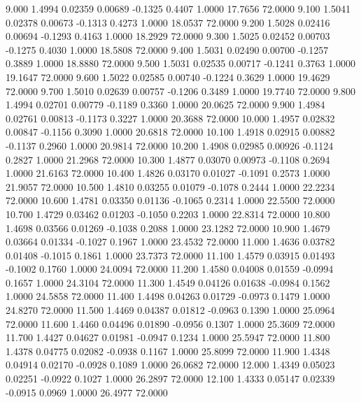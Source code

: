    9.000   1.4994   0.02359   0.00689  -0.1325   0.4407   1.0000  17.7656  72.0000
   9.100   1.5041   0.02378   0.00673  -0.1313   0.4273   1.0000  18.0537  72.0000
   9.200   1.5028   0.02416   0.00694  -0.1293   0.4163   1.0000  18.2929  72.0000
   9.300   1.5025   0.02452   0.00703  -0.1275   0.4030   1.0000  18.5808  72.0000
   9.400   1.5031   0.02490   0.00700  -0.1257   0.3889   1.0000  18.8880  72.0000
   9.500   1.5031   0.02535   0.00717  -0.1241   0.3763   1.0000  19.1647  72.0000
   9.600   1.5022   0.02585   0.00740  -0.1224   0.3629   1.0000  19.4629  72.0000
   9.700   1.5010   0.02639   0.00757  -0.1206   0.3489   1.0000  19.7740  72.0000
   9.800   1.4994   0.02701   0.00779  -0.1189   0.3360   1.0000  20.0625  72.0000
   9.900   1.4984   0.02761   0.00813  -0.1173   0.3227   1.0000  20.3688  72.0000
  10.000   1.4957   0.02832   0.00847  -0.1156   0.3090   1.0000  20.6818  72.0000
  10.100   1.4918   0.02915   0.00882  -0.1137   0.2960   1.0000  20.9814  72.0000
  10.200   1.4908   0.02985   0.00926  -0.1124   0.2827   1.0000  21.2968  72.0000
  10.300   1.4877   0.03070   0.00973  -0.1108   0.2694   1.0000  21.6163  72.0000
  10.400   1.4826   0.03170   0.01027  -0.1091   0.2573   1.0000  21.9057  72.0000
  10.500   1.4810   0.03255   0.01079  -0.1078   0.2444   1.0000  22.2234  72.0000
  10.600   1.4781   0.03350   0.01136  -0.1065   0.2314   1.0000  22.5500  72.0000
  10.700   1.4729   0.03462   0.01203  -0.1050   0.2203   1.0000  22.8314  72.0000
  10.800   1.4698   0.03566   0.01269  -0.1038   0.2088   1.0000  23.1282  72.0000
  10.900   1.4679   0.03664   0.01334  -0.1027   0.1967   1.0000  23.4532  72.0000
  11.000   1.4636   0.03782   0.01408  -0.1015   0.1861   1.0000  23.7373  72.0000
  11.100   1.4579   0.03915   0.01493  -0.1002   0.1760   1.0000  24.0094  72.0000
  11.200   1.4580   0.04008   0.01559  -0.0994   0.1657   1.0000  24.3104  72.0000
  11.300   1.4549   0.04126   0.01638  -0.0984   0.1562   1.0000  24.5858  72.0000
  11.400   1.4498   0.04263   0.01729  -0.0973   0.1479   1.0000  24.8270  72.0000
  11.500   1.4469   0.04387   0.01812  -0.0963   0.1390   1.0000  25.0964  72.0000
  11.600   1.4460   0.04496   0.01890  -0.0956   0.1307   1.0000  25.3609  72.0000
  11.700   1.4427   0.04627   0.01981  -0.0947   0.1234   1.0000  25.5947  72.0000
  11.800   1.4378   0.04775   0.02082  -0.0938   0.1167   1.0000  25.8099  72.0000
  11.900   1.4348   0.04914   0.02170  -0.0928   0.1089   1.0000  26.0682  72.0000
  12.000   1.4349   0.05023   0.02251  -0.0922   0.1027   1.0000  26.2897  72.0000
  12.100   1.4333   0.05147   0.02339  -0.0915   0.0969   1.0000  26.4977  72.0000
